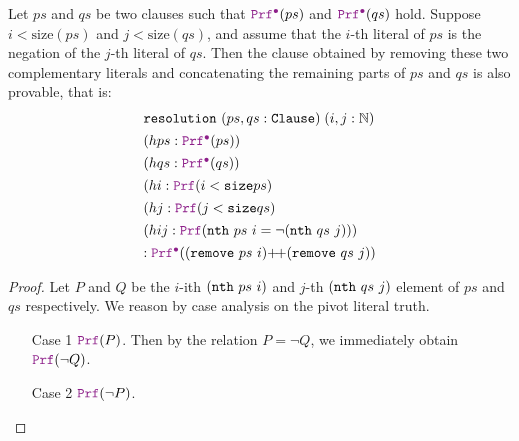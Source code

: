 \begin{theorem}[Resolution]
Let $ps$ and $qs$ be two clauses such that $\prfcl(ps)$ and $\prfcl(qs)$ hold. 
Suppose $i < \mathrm{size}(ps)$ and $j < \mathrm{size}(qs)$, and assume that the $i$-th literal of $ps$ is the negation of the $j$-th literal of $qs$. 
Then the clause obtained by removing these two complementary literals and  concatenating the remaining parts of $ps$ and $qs$ is also provable, that is:
\[
\begin{array}{l}
  \tt{resolution}~(ps, qs : \tt{Clause})\; (i, j : \mathbb{N}) \\[4pt]
  (hps : \prfcl(ps)) \\[4pt]
  (hqs : \prfcl(qs)) \\[4pt]
  (hi  : \prf(i < \tt{size} ps) \\[4pt]
  (hj  : \prf(j < \tt{size} qs) \\[4pt]
  (hij : \prf(\tt{nth}~ps~i = \lnot(\tt{nth}~qs~j))) \\[4pt]
  : \prfcl((\tt{remove}~ps~i) \pp (\tt{remove}~qs~j))
\end{array}
\]
\begin{proof}
Let $P$ and $Q$ be the $i$-ith $(\tt{nth}~ps~i)$ and $j$-th $(\tt{nth}~qs~j)$ element of $ps$ and $qs$ respectively.
We reason by case analysis on the pivot literal truth.  

\begin{itemize}
\item[Case 1] \(\prf(P)\).  
Then by the relation $P = \lnot Q$, we immediately obtain $\prf(\lnot Q)$.  

\item[Case 2] \(\prf(\lnot P)\).  
\end{itemize}


\end{proof}
\end{theorem}
